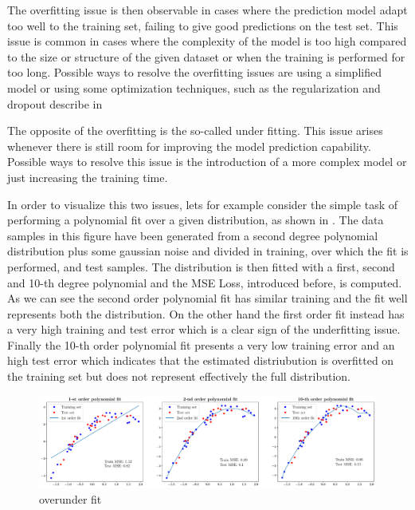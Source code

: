 The overfitting issue is then observable in cases where the prediction model adapt too well to the training set, failing to give good predictions on the test set. This issue is common in cases where the complexity of the model is too high compared to the size or structure of the given dataset or when the training is performed for too long. Possible ways to resolve the overfitting issues are using a simplified model or using some optimization techniques, such as the regularization and dropout describe in 

The opposite of the overfitting is the so-called under fitting. This issue arises whenever there is still room for improving the model prediction capability. Possible ways to resolve this issue is the introduction of a more complex model or just increasing the training time.

In order to visualize this two issues, lets for example consider the simple task of performing a polynomial fit over a given distribution, as shown in  . The data samples in this figure have been generated from a second degree polynomial distribution plus some gaussian noise and divided in training, over which the fit is performed, and test samples. The distribution is then fitted with a first, second and 10-th degree polynomial and the MSE Loss, introduced before, is computed. As we can see the second order polynomial fit has similar training and the fit well represents both the distribution. On the other hand the first order fit instead has a very high training and test error which is a clear sign of the underfitting issue. Finally the 10-th order polynomial fit presents a very low training error and an high test error which indicates that the estimated distriubution is overfitted on the training set but does not represent effectively the full distribution.

\begin{figure}
    \centering
\includegraphics[width=\textwidth]{images/networks/over_under_fit.pdf}
\caption{overunder fit }
    \label{fig:overunderfit}
\end{figure}


